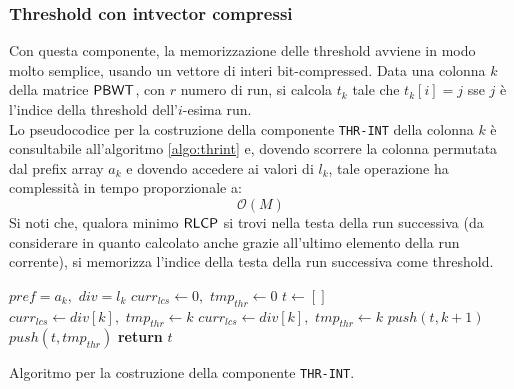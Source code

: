 \subsubsection{Threshold con intvector compressi}
Con questa componente, la memorizzazione delle threshold avviene in modo molto
semplice, 
usando un vettore di interi bit-compressed. Data una colonna $k$ della
matrice $\mbox{\rm {\sf PBWT}}$, con $r$ numero di run, si calcola $t_k$ tale che
$t_k[i]=j$ sse $j$ è l'indice della threshold dell'$i$-esima run.\\
Lo pseudocodice per la costruzione della componente
\texttt{THR-INT} della colonna $k$ è consultabile all'algoritmo
\ref{algo:thrint} 
e, dovendo scorrere la colonna permutata dal prefix array $a_k$ e dovendo
accedere ai valori di $l_k$, tale operazione ha complessità in tempo
proporzionale a:
\begin{equation}
  \label{eq:thrint}
  \mathcal{O}(M)
\end{equation}
Si noti che, qualora minimo $\mbox{\rm {\sf RLCP}}$ si trovi nella testa della run successiva
(da considerare in quanto calcolato anche grazie all'ultimo elemento della run
corrente), si memorizza l'indice della testa della run
successiva come threshold.
\begin{algorithm}
  \begin{algorithmic}
    \Comment $pref=a_k,\,\,div=l_k$
    \State $curr_{lcs}\gets 0,\,\,tmp_{thr}\gets 0$
    \State $t\gets[]$
    \For {\textit{every} $k\in\left[0,\,\, M\right)$}
    \State $curr_{lcs}\gets div[k],\,\,tmp_{thr}\gets k$
    \EndIf
    \State $curr_{lcs}\gets div[k],\,\,tmp_{thr}\gets k$
    \EndIf
    \State $push(t, k+1)$
    \Else 
    \State $push(t, tmp_{thr})$
    \EndIf
    \EndIf
    \EndFor
    \State \textbf{return} $t$  
    \EndFunction
  \end{algorithmic}
  \caption{Algoritmo per la costruzione della componente \texttt{THR-INT}.}
  \label{algo:thrint}
\end{algorithm}
